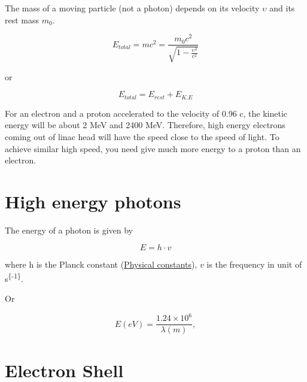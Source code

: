 \documentclass[]{book}
\theoremstyle{definition}
\theoremstyle{definition}
\theoremstyle{definition}
\theoremstyle{remark}
\begin{document}
The mass of a moving particle (not a photon) depends on its velocity
\(\upsilon\) and its rest mass \(m_0\).

\begin{equation}
    E_{total} = mc^2 = \frac{m_0c^2}{\sqrt{1-\frac{\upsilon^2}{c^2}}} 
    \label{eq:emc2}
\end{equation}

or

\begin{equation}
    E_{total} = E_{rest}+E_{K.E} 
\end{equation}

For an electron and a proton accelerated to the velocity of 0.96 c, the
kinetic energy will be about 2 MeV and 2400 MeV. Therefore, high energy
electrons coming out of linac head will have the speed close to the
speed of light. To achieve similar high speed, you need give much more
energy to a proton than an electron.

\section{High energy photons}\label{high-energy-photons}

The energy of a photon is given by

\begin{equation}
    E = h\cdot v
    \label{eq:frequency}
\end{equation}

where h is the Planck constant (\protect\hyperlink{constant}{Physical
constants}), \(v\) is the frequency in unit of
s\textsuperscript{\{-1\}}.

Or

\begin{equation}
    E (eV) = \frac{1.24\times 10^{6}}{\lambda (m)}, 
    \label{eq:wavelength}
\end{equation}

\section{Electron Shell}\label{electron-shell}
\end{document}
